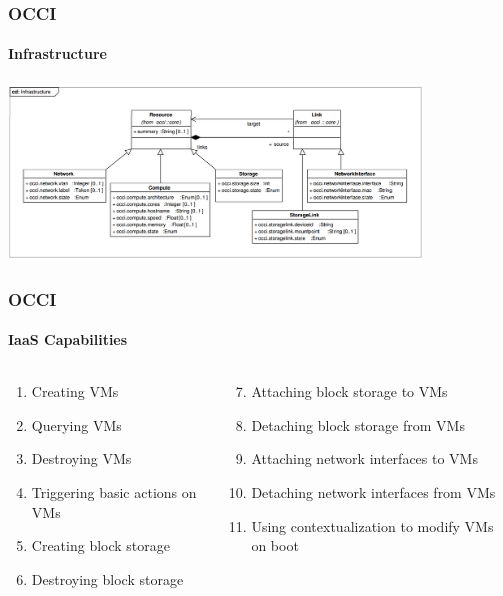 \begin{frame}
  \frametitle{OCCI}
  \framesubtitle{Infrastructure}

  \includegraphics[width=11cm]{images/occi_infra_spec}
\end{frame}

\begin{frame}
  \frametitle{OCCI}
  \framesubtitle{IaaS Capabilities}

  \begin{columns}
  \begin{column}{0.5\textwidth}
    \begin{enumerate}
        \item Creating VMs
        \item Querying VMs
        \item Destroying VMs
        \item Triggering basic actions on VMs
        \item Creating block storage
        \item Destroying block storage
    \end{enumerate}
  \end{column}

  \begin{column}{0.5\textwidth}
    \begin{enumerate}
    \setcounter{enumi}{6}
        \item Attaching block storage to VMs
        \item Detaching block storage from VMs
        \item Attaching network interfaces to VMs
        \item Detaching network interfaces from VMs
        \item Using contextualization to modify VMs on boot
    \end{enumerate}
  \end{column}
  \end{columns}
\end{frame}

